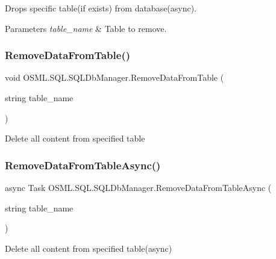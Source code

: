 Drops specific table(if exists) from database(async). 


\begin{DoxyParams}{Parameters}
{\em table\+\_\+name} & Table to remove.\\
\hline
\end{DoxyParams}
\mbox{\label{classOSML_1_1SQL_1_1SQLDbManager_a5720ab26bbf742446eac817e80ea22a6}} 
\subsubsection{\texorpdfstring{RemoveDataFromTable()}{RemoveDataFromTable()}}
{\footnotesize\ttfamily void O\+S\+M\+L.\+S\+Q\+L.\+S\+Q\+L\+Db\+Manager.\+Remove\+Data\+From\+Table (\begin{DoxyParamCaption}\item[{string}]{table\+\_\+name }\end{DoxyParamCaption})\hspace{0.3cm}{\ttfamily [inline]}}



Delete all content from specified table 

\mbox{\label{classOSML_1_1SQL_1_1SQLDbManager_a05cda1ed133ece2d363f531c865b76de}} 
\subsubsection{\texorpdfstring{RemoveDataFromTableAsync()}{RemoveDataFromTableAsync()}}
{\footnotesize\ttfamily async Task O\+S\+M\+L.\+S\+Q\+L.\+S\+Q\+L\+Db\+Manager.\+Remove\+Data\+From\+Table\+Async (\begin{DoxyParamCaption}\item[{string}]{table\+\_\+name }\end{DoxyParamCaption})\hspace{0.3cm}{\ttfamily [inline]}}



Delete all content from specified table(async) 

